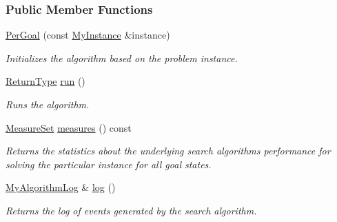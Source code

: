 \subsubsection*{Public Member Functions}
\begin{DoxyCompactItemize}
\item 
\hyperlink{structalgorithm_1_1PerGoal_aba385653cc1ef4dc462e56d34be261ea}{Per\+Goal} (const \hyperlink{structalgorithm_1_1PerGoal_abc8d409fe41f1ee61d4c1a6132c62801}{My\+Instance} \&instance)
\begin{DoxyCompactList}\small\item\em Initializes the algorithm based on the problem instance. \end{DoxyCompactList}\item 
\hyperlink{structalgorithm_1_1PerGoal_abe16f9913b5ec8d9ee8ebb93e375eba0}{Return\+Type} \hyperlink{structalgorithm_1_1PerGoal_a6aaedb1ac157b0070605e96e577f3535}{run} ()
\begin{DoxyCompactList}\small\item\em Runs the algorithm. \end{DoxyCompactList}\item 
\hyperlink{structMeasureSet}{Measure\+Set} \hyperlink{structalgorithm_1_1PerGoal_ad942067f9741fa23d07d482f016fe44e}{measures} () const 
\begin{DoxyCompactList}\small\item\em Returns the statistics about the underlying search algorithm\textquotesingle{}s performance for solving the particular instance for all goal states. \end{DoxyCompactList}\item 
\hyperlink{structalgorithm_1_1PerGoal_aef16fed26bdac27da2059957a1e24650}{My\+Algorithm\+Log} \& \hyperlink{structalgorithm_1_1PerGoal_af0dabfcf3118bee99fb4c5984f44b0e7}{log} ()
\begin{DoxyCompactList}\small\item\em Returns the log of events generated by the search algorithm. \end{DoxyCompactList}\end{DoxyCompactItemize}

